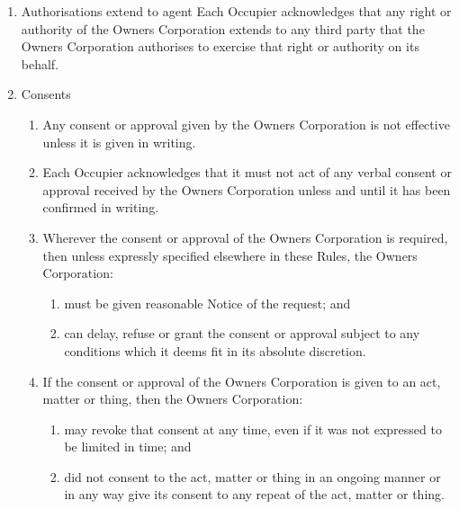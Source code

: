 \documentclass{article}
\begin{document}
\begin{enumerate}[label=\arabic*.]
\begin{enumerate}[label=\arabic{enumi}.\arabic*.]
\begin{enumerate}[label=(\arabic*)]
\end{enumerate}

\item  Authorisations extend to agent Each Occupier acknowledges that any right or authority of the Owners Corporation extends to any third party that the Owners Corporation authorises to exercise that right or authority on its behalf.
\newpage



\item  Consents

\begin{enumerate}[label=(\arabic*)]

\item  Any consent or approval given by the Owners Corporation is not effective unless it is given in writing.

\item  Each Occupier acknowledges that it must not act of any verbal consent or approval received by the Owners Corporation unless and until it has been confirmed in writing.

\item  Wherever the consent or approval of the Owners Corporation is required, then unless expressly specified elsewhere in these Rules, the Owners Corporation:

\begin{enumerate}[label=(\alph*)]

\item  must be given reasonable Notice of the request; and

\item  can delay, refuse or grant the consent or approval subject to any conditions which it deems fit in its absolute discretion.

\end{enumerate}

\item  If the consent or approval of the Owners Corporation is given to an act, matter or thing, then the Owners Corporation:

\begin{enumerate}[label=(\alph*)]

\item  may revoke that consent at any time, even if it was not expressed to be limited in time; and

\item  did not consent to the act, matter or thing in an ongoing manner or in any way give its consent to any repeat of the act, matter or thing.


\end{enumerate}
\end{enumerate}
\end{enumerate}
\end{enumerate}
\end{document}

